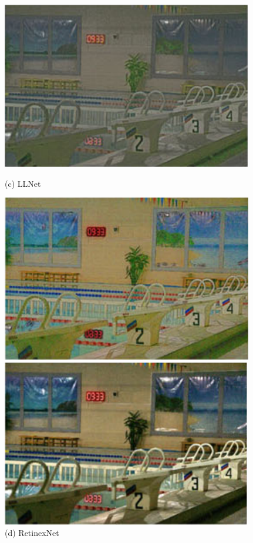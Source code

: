 \documentclass[CJK,aspectratio=169]{beamer}  %
\begin{document}
\begin{frame}
\begin{figure}
\begin{minipage}{0.19\textwidth}
			\includegraphics[width=\linewidth]{picture/LLIE/Efficent/LLNet}				
			\caption*{\tiny (c) LLNet}
			\label{fig: LLI LLNet}	
		\end{minipage}
		\begin{minipage}{0.19\textwidth}
			\includegraphics[width=\linewidth]{picture/LLIE/Efficent/RetinexNet}
			\caption*{\tiny (d) RetinexNet}
			\label{fig: LLI RetinexNet}	
		\end{minipage}
		\begin{minipage}{0.19\textwidth}
			\includegraphics[width=\linewidth]{picture/LLIE/Efficent/KinD}

\end{minipage}
\end{figure}
\end{frame}
\end{document}
